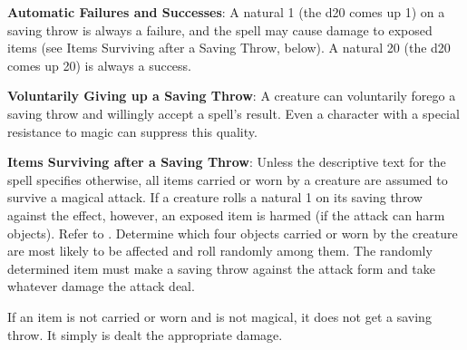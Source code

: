 \textbf{Automatic Failures and Successes}: A natural 1 (the d20 comes up 1) on a saving throw is always a failure, and the spell may cause damage to exposed items (see Items Surviving after a Saving Throw, below). A natural 20 (the d20 comes up 20) is always a success.

\textbf{Voluntarily Giving up a Saving Throw}: A creature can voluntarily forego a saving throw and willingly accept a spell's result. Even a character with a special resistance to magic can suppress this quality.

\textbf{Items Surviving after a Saving Throw}: Unless the descriptive text for the spell specifies otherwise, all items carried or worn by a creature are assumed to survive a magical attack. If a creature rolls a natural 1 on its saving throw against the effect, however, an exposed item is harmed (if the attack can harm objects). Refer to . Determine which four objects carried or worn by the creature are most likely to be affected and roll randomly among them. The randomly determined item must make a saving throw against the attack form and take whatever damage the attack deal.

If an item is not carried or worn and is not magical, it does not get a saving throw. It simply is dealt the appropriate damage.

